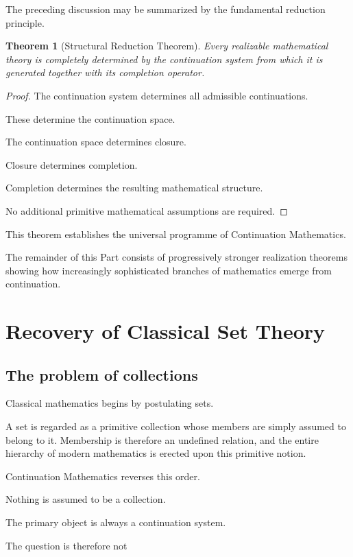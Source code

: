 \documentclass[13pt,openany]{book}
\theoremstyle{plain}
\newtheorem{theorem}{Theorem}[chapter]
\theoremstyle{definition}
\begin{document}
The preceding discussion may be summarized by the fundamental reduction
principle.

\begin{theorem}[Structural Reduction Theorem]
Every realizable mathematical theory is completely determined by the
continuation system from which it is generated together with its completion
operator.
\end{theorem}

\begin{proof}
The continuation system determines all admissible continuations.

These determine the continuation space.

The continuation space determines closure.

Closure determines completion.

Completion determines the resulting mathematical structure.

No additional primitive mathematical assumptions are required.
\end{proof}

This theorem establishes the universal programme of Continuation
Mathematics.

The remainder of this Part consists of progressively stronger realization
theorems showing how increasingly sophisticated branches of mathematics
emerge from continuation.

\chapter{Recovery of Classical Set Theory}

\section{The problem of collections}

Classical mathematics begins by postulating sets.

A set is regarded as a primitive collection whose members are simply assumed
to belong to it. Membership is therefore an undefined relation, and the
entire hierarchy of modern mathematics is erected upon this primitive notion.

Continuation Mathematics reverses this order.

Nothing is assumed to be a collection.

The primary object is always a continuation system.

The question is therefore not
\end{document}
